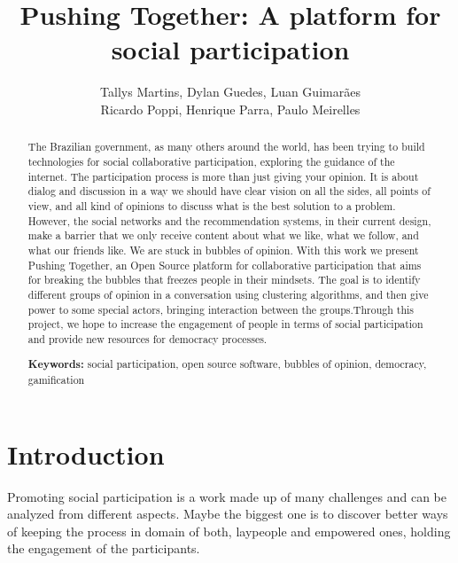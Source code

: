\documentclass{llncs}
\begin{document}
\sloppy
\title{Pushing Together: A platform for social participation}

\author{Tallys Martins, Dylan Guedes, Luan Guimarães\\
        Ricardo Poppi, Henrique Parra, Paulo Meirelles}

  

\maketitle
\begin{abstract}
  The Brazilian government, as many others around the world, has been trying to
build technologies for social collaborative participation, exploring the
guidance of the internet. The participation process is more than just giving
your opinion. It is about dialog and discussion in a way we should have clear
vision on all the sides, all points of view, and all kind of opinions to
discuss what is the best solution to a problem. However, the social networks
and the recommendation systems, in their current design, make a barrier that we
only receive content about what we like, what we follow, and what our friends
like. We are stuck in bubbles of opinion.  With this work we present Pushing
Together, an Open Source platform for collaborative participation that aims for
breaking the bubbles that freezes people in their mindsets. The goal is to
identify different groups of opinion in a conversation using clustering
algorithms, and then give power to some special actors, bringing interaction
between the groups.Through this project, we hope to increase the engagement of
people in terms of social participation and provide new resources for democracy
processes.

\textbf{Keywords:} social participation, open source software, bubbles of
opinion, democracy, gamification
\end{abstract}

\section{Introduction}
\label{sec:intro}
  Promoting social participation is a work made up of many challenges and can
be analyzed from different aspects. Maybe the biggest one is to discover better
ways of keeping the process in domain of both, laypeople and empowered ones,
holding the engagement of the participants.
\end{document}
